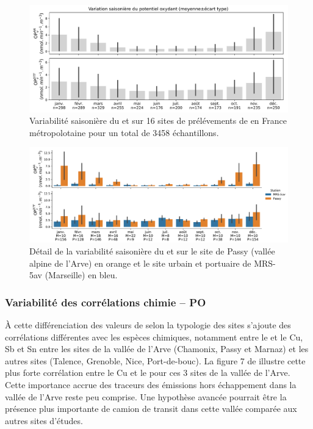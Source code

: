 \begin{figure}[ht]
    \centering
    \includegraphics[width=1.0\linewidth]{figures/chapter04/variabilite_saisonniere.pdf}
    \caption{Variabilité saisonière du \POAAv{} et \PODTTv{} sur 16 sites de prélévements
        de \PMdix{} en France métropolotaine pour un total de 3458 échantillons.
    }%
    \label{fig:variabilite_saisonniere}
\end{figure}


\begin{figure}[ht]
    \centering
    \includegraphics[width=1.0\linewidth]{figures/chapter04/variabilite_saisonniere_MRS-Passy.pdf}
    \caption{Détail de la variabilité saisonière du \POAAv{} et \PODTTv{} sur le site de
        Passy (vallée alpine de l'Arve) en orange et le site urbain et portuaire de MRS-5av
        (Marseille) en bleu.
    }%
    \label{fig:variabilite_saisonniere_MRS_PASSY}
\end{figure}

\subsubsection{Variabilité des corrélations chimie -- PO}%
\label{ssub:_variabilité_des_corrélations_chimie_po}

À cette différenciation des valeurs de \POv{} selon la typologie des sites s'ajoute des
corrélations différentes avec les espèces chimiques, notamment entre le \POAAv{} et le
Cu, Sb et Sn entre les sites de la vallée de l'Arve (Chamonix, Passy et Marnaz) et les
autres sites (Talence, Grenoble, Nice, Port-de-bouc). La figure 7 de
\cite{calasSeasonal2019} illustre cette plus forte corrélation entre le Cu et le \POAAv{}
pour ces 3 sites de la vallée de l'Arve. Cette importance accrue des traceurs des
émissions hors échappement dans la vallée de l'Arve reste peu comprise. Une hypothèse
avancée pourrait être la présence plus importante de camion de transit dans cette vallée
comparée aux autres sites d'études.

